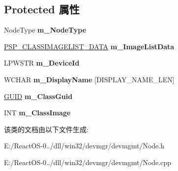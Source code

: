 \subsection*{Protected 属性}
\begin{DoxyCompactItemize}
\item 
\mbox{\label{class_c_node_ab0e4bc7065c8ca72b20f8bdb1e7a18fd}} 
Node\+Type {\bfseries m\+\_\+\+Node\+Type}
\item 
\mbox{\label{class_c_node_aa2f3b2493a30f1525f89d71204dd1c42}} 
\hyperlink{struct___s_p___c_l_a_s_s_i_m_a_g_e_l_i_s_t___d_a_t_a}{P\+S\+P\+\_\+\+C\+L\+A\+S\+S\+I\+M\+A\+G\+E\+L\+I\+S\+T\+\_\+\+D\+A\+TA} {\bfseries m\+\_\+\+Image\+List\+Data}
\item 
\mbox{\label{class_c_node_a368f075b06f0c9d50f3798ac4438c686}} 
L\+P\+W\+S\+TR {\bfseries m\+\_\+\+Device\+Id}
\item 
\mbox{\label{class_c_node_ae50871d0b8f3c2582f6031108a2fd9c7}} 
W\+C\+H\+AR {\bfseries m\+\_\+\+Display\+Name} \mbox{[}D\+I\+S\+P\+L\+A\+Y\+\_\+\+N\+A\+M\+E\+\_\+\+L\+EN\mbox{]}
\item 
\mbox{\label{class_c_node_ac75f5d7de7a800083ba47f53731c9f90}} 
\hyperlink{interface_g_u_i_d}{G\+U\+ID} {\bfseries m\+\_\+\+Class\+Guid}
\item 
\mbox{\label{class_c_node_a9de26a848fe8eae54a76ac29576cd32e}} 
I\+NT {\bfseries m\+\_\+\+Class\+Image}
\end{DoxyCompactItemize}


该类的文档由以下文件生成\+:\begin{DoxyCompactItemize}
\item 
E\+:/\+React\+O\+S-\/0../dll/win32/devmgr/devmgmt/Node.\+h\item 
E\+:/\+React\+O\+S-\/0../dll/win32/devmgr/devmgmt/Node.\+cpp\end{DoxyCompactItemize}
